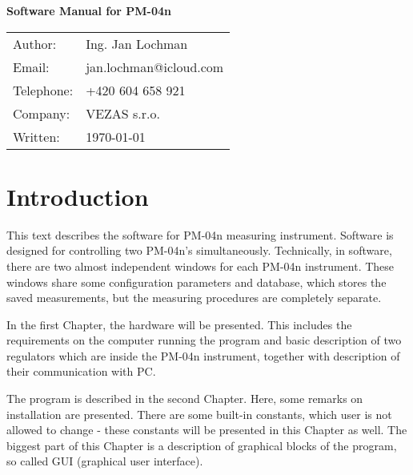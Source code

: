 \documentclass[a4paper,11pt,oneside]{report}
\theoremstyle{named}
\begin{document}
\thispagestyle{empty}

\begin{center}

  \vspace*{40mm}

  {\huge \bf Software Manual for PM-04n}

  \vfill

  {\large
   \begin{tabular}{ll}
     Author:    & Ing. Jan Lochman \\
     Email:     & jan.lochman@icloud.com \\
     Telephone: & +420 604 658 921 \\
     Company:   & VEZAS s.r.o. \\
     Written:   & \today
   \end{tabular}
  }
\end{center}

\clearpage
{}
\setcounter{page}{1}

\begin{spacing}{0.9}
  \tableofcontents
\end{spacing}

\newpage
\clearpage
{}
\setcounter{page}{1}

\chapter*{Introduction}

This text describes the software for PM-04n measuring instrument. Software is
designed for controlling two PM-04n's simultaneously. Technically, in software,
there are two almost independent windows for each PM-04n instrument. These
windows share some configuration parameters and database, which stores the saved
measurements, but the measuring procedures are completely separate.

In the first Chapter, the hardware will be presented. This includes the
requirements on the computer running the program and basic description of two
regulators which are inside the PM-04n instrument, together with description of
their communication with PC.

The program is described in the second Chapter. Here, some remarks on
installation are presented. There are some built-in constants, which user is not
allowed to change - these constants will be presented in this Chapter as well.
The biggest part of this Chapter is a description of graphical blocks of the
program, so called GUI (graphical user interface).
\end{document}
